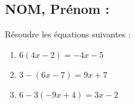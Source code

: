 \documentclass[a4paper,11pt,exos]{nsi} %
\begin{document}
\subsection*{NOM, Prénom : \dotfill} 


\maketitle




\begin{exercice}
Résoudre les équations suivantes :
\begin{multicols}{3}
	\begin{enumerate}
		\item $6(4x-2)=-4x-5$
			\item $3-(6x-7)=9x+7$
			\item $6-3(-9x+4)=3x-2$
	\end{enumerate}
\end{multicols}

\end{exercice}

\end{document}
